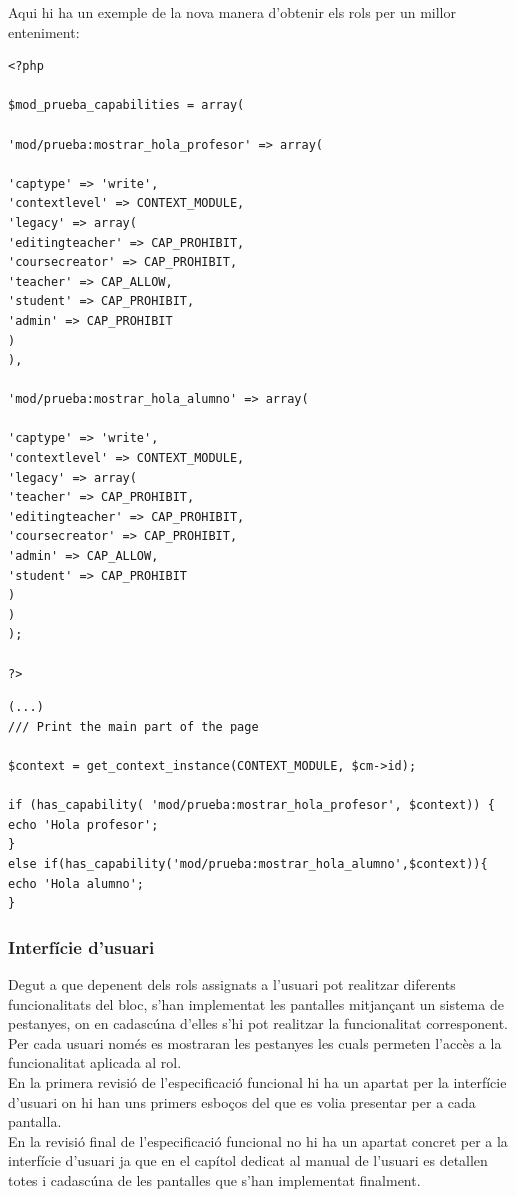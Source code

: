 \documentclass[a4paper]{report}  %
\begin{document}
Aqui hi ha un exemple de la nova manera d'obtenir els rols per un millor enteniment:
\begin{lstlisting}[style=PHP, caption=Fitxer access.db]
<?php

$mod_prueba_capabilities = array(

'mod/prueba:mostrar_hola_profesor' => array(

'captype' => 'write',
'contextlevel' => CONTEXT_MODULE,
'legacy' => array(
'editingteacher' => CAP_PROHIBIT,
'coursecreator' => CAP_PROHIBIT,
'teacher' => CAP_ALLOW,
'student' => CAP_PROHIBIT,
'admin' => CAP_PROHIBIT
)
),

'mod/prueba:mostrar_hola_alumno' => array(

'captype' => 'write',
'contextlevel' => CONTEXT_MODULE,
'legacy' => array(
'teacher' => CAP_PROHIBIT,
'editingteacher' => CAP_PROHIBIT,
'coursecreator' => CAP_PROHIBIT,
'admin' => CAP_ALLOW,
'student' => CAP_PROHIBIT
)
)
);

?>
\end{lstlisting}
\begin{lstlisting}[style=PHP, caption=Fitxer view.php]
(...)
/// Print the main part of the page

$context = get_context_instance(CONTEXT_MODULE, $cm->id);

if (has_capability( 'mod/prueba:mostrar_hola_profesor', $context)) {
echo 'Hola profesor';
}
else if(has_capability('mod/prueba:mostrar_hola_alumno',$context)){ 
echo 'Hola alumno';
} 
\end{lstlisting}
\subsubsection{Interfície d'usuari}
Degut a que depenent dels rols assignats a l'usuari pot realitzar diferents funcionalitats del bloc, s'han implementat les pantalles mitjançant un sistema de pestanyes, on en cadascúna d'elles s'hi pot realitzar la funcionalitat corresponent. Per cada usuari només es mostraran les pestanyes les cuals permeten l'accès a la funcionalitat aplicada al rol. \\
En la primera revisió de l'especificació funcional hi ha un apartat per la interfície d'usuari on hi han uns primers esboços del que es volia presentar per a cada pantalla. \\
En la revisió final de l'especificació funcional no hi ha un apartat concret per a la interfície d'usuari ja que en el capítol dedicat al manual de l'usuari es detallen totes i cadascúna de les pantalles que s'han implementat finalment.\\
\end{document}

